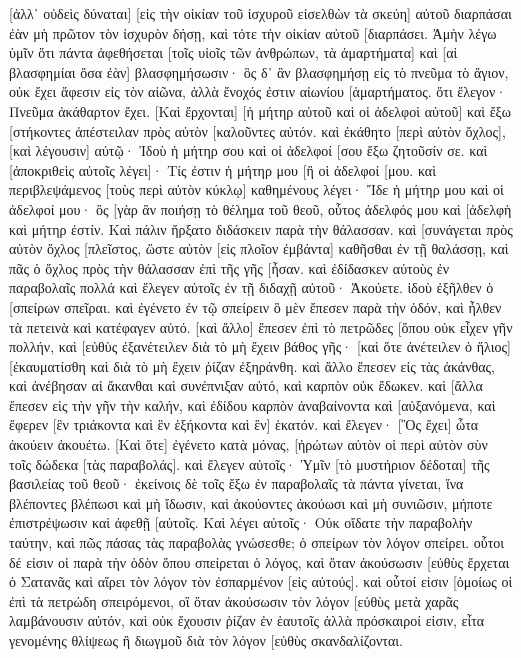 [ἀλλ᾽ οὐδεὶς δύναται] [εἰς τὴν οἰκίαν τοῦ ἰσχυροῦ εἰσελθὼν τὰ σκεύη] αὐτοῦ διαρπάσαι ἐὰν μὴ πρῶτον τὸν ἰσχυρὸν δήσῃ, καὶ τότε τὴν οἰκίαν αὐτοῦ [διαρπάσει. 
Ἀμὴν λέγω ὑμῖν ὅτι πάντα ἀφεθήσεται [τοῖς υἱοῖς τῶν ἀνθρώπων, τὰ ἁμαρτήματα] καὶ [αἱ βλασφημίαι ὅσα ἐὰν] βλασφημήσωσιν· 
ὃς δ᾽ ἂν βλασφημήσῃ εἰς τὸ πνεῦμα τὸ ἅγιον, οὐκ ἔχει ἄφεσιν εἰς τὸν αἰῶνα, ἀλλὰ ἔνοχός ἐστιν αἰωνίου [ἁμαρτήματος. 
ὅτι ἔλεγον· Πνεῦμα ἀκάθαρτον ἔχει. 
[Καὶ ἔρχονται] [ἡ μήτηρ αὐτοῦ καὶ οἱ ἀδελφοὶ αὐτοῦ] καὶ ἔξω [στήκοντες ἀπέστειλαν πρὸς αὐτὸν [καλοῦντες αὐτόν. 
καὶ ἐκάθητο [περὶ αὐτὸν ὄχλος], [καὶ λέγουσιν] αὐτῷ· Ἰδοὺ ἡ μήτηρ σου καὶ οἱ ἀδελφοί [σου ἔξω ζητοῦσίν σε. 
καὶ [ἀποκριθεὶς αὐτοῖς λέγει]· Τίς ἐστιν ἡ μήτηρ μου [ἢ οἱ ἀδελφοί [μου. 
καὶ περιβλεψάμενος [τοὺς περὶ αὐτὸν κύκλῳ] καθημένους λέγει· Ἴδε ἡ μήτηρ μου καὶ οἱ ἀδελφοί μου· 
ὃς [γὰρ ἂν ποιήσῃ τὸ θέλημα τοῦ θεοῦ, οὗτος ἀδελφός μου καὶ [ἀδελφὴ καὶ μήτηρ ἐστίν. 
Καὶ πάλιν ἤρξατο διδάσκειν παρὰ τὴν θάλασσαν. καὶ [συνάγεται πρὸς αὐτὸν ὄχλος [πλεῖστος, ὥστε αὐτὸν [εἰς πλοῖον ἐμβάντα] καθῆσθαι ἐν τῇ θαλάσσῃ, καὶ πᾶς ὁ ὄχλος πρὸς τὴν θάλασσαν ἐπὶ τῆς γῆς [ἦσαν. 
καὶ ἐδίδασκεν αὐτοὺς ἐν παραβολαῖς πολλά καὶ ἔλεγεν αὐτοῖς ἐν τῇ διδαχῇ αὐτοῦ· 
Ἀκούετε. ἰδοὺ ἐξῆλθεν ὁ [σπείρων σπεῖραι. 
καὶ ἐγένετο ἐν τῷ σπείρειν ὃ μὲν ἔπεσεν παρὰ τὴν ὁδόν, καὶ ἦλθεν τὰ πετεινὰ καὶ κατέφαγεν αὐτό. 
[καὶ ἄλλο] ἔπεσεν ἐπὶ τὸ πετρῶδες [ὅπου οὐκ εἶχεν γῆν πολλήν, καὶ [εὐθὺς ἐξανέτειλεν διὰ τὸ μὴ ἔχειν βάθος γῆς· 
[καὶ ὅτε ἀνέτειλεν ὁ ἥλιος] [ἐκαυματίσθη καὶ διὰ τὸ μὴ ἔχειν ῥίζαν ἐξηράνθη. 
καὶ ἄλλο ἔπεσεν εἰς τὰς ἀκάνθας, καὶ ἀνέβησαν αἱ ἄκανθαι καὶ συνέπνιξαν αὐτό, καὶ καρπὸν οὐκ ἔδωκεν. 
καὶ [ἄλλα ἔπεσεν εἰς τὴν γῆν τὴν καλήν, καὶ ἐδίδου καρπὸν ἀναβαίνοντα καὶ [αὐξανόμενα, καὶ ἔφερεν [ἓν τριάκοντα καὶ ἓν ἑξήκοντα καὶ ἓν] ἑκατόν. 
καὶ ἔλεγεν· [Ὃς ἔχει] ὦτα ἀκούειν ἀκουέτω. 
[Καὶ ὅτε] ἐγένετο κατὰ μόνας, [ἠρώτων αὐτὸν οἱ περὶ αὐτὸν σὺν τοῖς δώδεκα [τὰς παραβολάς]. 
καὶ ἔλεγεν αὐτοῖς· Ὑμῖν [τὸ μυστήριον δέδοται] τῆς βασιλείας τοῦ θεοῦ· ἐκείνοις δὲ τοῖς ἔξω ἐν παραβολαῖς τὰ πάντα γίνεται, 
ἵνα βλέποντες βλέπωσι καὶ μὴ ἴδωσιν, καὶ ἀκούοντες ἀκούωσι καὶ μὴ συνιῶσιν, μήποτε ἐπιστρέψωσιν καὶ ἀφεθῇ [αὐτοῖς. 
Καὶ λέγει αὐτοῖς· Οὐκ οἴδατε τὴν παραβολὴν ταύτην, καὶ πῶς πάσας τὰς παραβολὰς γνώσεσθε; 
ὁ σπείρων τὸν λόγον σπείρει. 
οὗτοι δέ εἰσιν οἱ παρὰ τὴν ὁδὸν ὅπου σπείρεται ὁ λόγος, καὶ ὅταν ἀκούσωσιν [εὐθὺς ἔρχεται ὁ Σατανᾶς καὶ αἴρει τὸν λόγον τὸν ἐσπαρμένον [εἰς αὐτούς]. 
καὶ οὗτοί εἰσιν [ὁμοίως οἱ ἐπὶ τὰ πετρώδη σπειρόμενοι, οἳ ὅταν ἀκούσωσιν τὸν λόγον [εὐθὺς μετὰ χαρᾶς λαμβάνουσιν αὐτόν, 
καὶ οὐκ ἔχουσιν ῥίζαν ἐν ἑαυτοῖς ἀλλὰ πρόσκαιροί εἰσιν, εἶτα γενομένης θλίψεως ἢ διωγμοῦ διὰ τὸν λόγον [εὐθὺς σκανδαλίζονται. 
